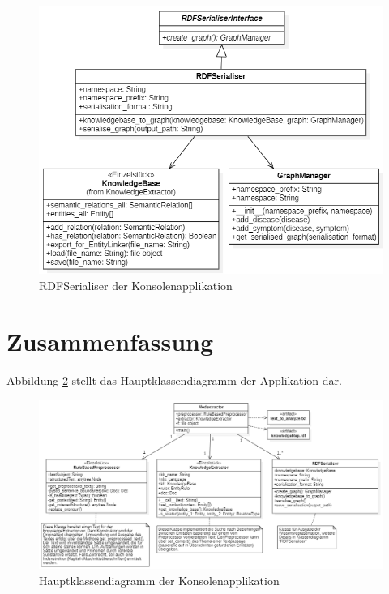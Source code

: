 \begin{figure}[h]
    \centering
    \includegraphics[width=\textwidth]{pictures/RDFSerialiser.png}
    \caption{RDFSerialiser der Konsolenapplikation}
    \label{fig:RDFSerialiser}
\end{figure}



\section{Zusammenfassung}
\label{sec:zusammenfassung modellierung} 

Abbildung \ref{fig:mainClassDiagram} stellt das Hauptklassendiagramm der Applikation dar.

\begin{figure}[h]
    \centering
    \includegraphics[width=\textwidth]{pictures/Main.png}
    \caption{Hauptklassendiagramm der Konsolenapplikation}
    \label{fig:mainClassDiagram}
\end{figure}